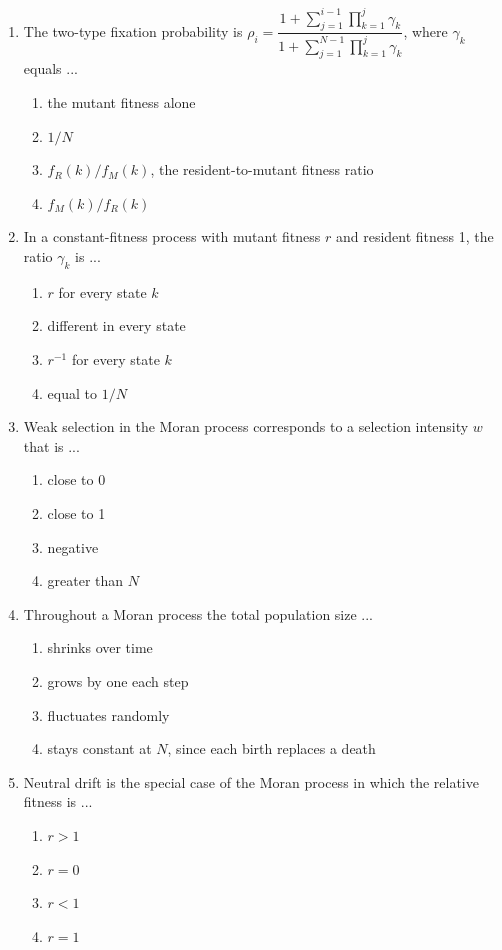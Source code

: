 \documentclass[11pt]{article}
\begin{document}
\begin{enumerate}[itemsep=6pt]
  \begin{enumerate}
    \item exactly \(1\)
    \item above the neutral value \(1/N\)
    \item exactly \(1/2\)
    \item below the neutral value \(1/N\)
  \end{enumerate}
  \item The two-type fixation probability is \(\rho_i = \dfrac{1 + \sum_{j=1}^{i-1}\prod_{k=1}^{j}\gamma_k}{1 + \sum_{j=1}^{N-1}\prod_{k=1}^{j}\gamma_k}\), where \(\gamma_k\) equals ...
  \begin{enumerate}
    \item the mutant fitness alone
    \item \(1/N\)
    \item \(f_R(k)/f_M(k)\), the resident-to-mutant fitness ratio
    \item \(f_M(k)/f_R(k)\)
  \end{enumerate}
  \item In a constant-fitness process with mutant fitness \(r\) and resident fitness 1, the ratio \(\gamma_k\) is ...
  \begin{enumerate}
    \item \(r\) for every state \(k\)
    \item different in every state
    \item \(r^{-1}\) for every state \(k\)
    \item equal to \(1/N\)
  \end{enumerate}
  \item Weak selection in the Moran process corresponds to a selection intensity \(w\) that is ...
  \begin{enumerate}
    \item close to 0
    \item close to 1
    \item negative
    \item greater than \(N\)
  \end{enumerate}
  \item Throughout a Moran process the total population size ...
  \begin{enumerate}
    \item shrinks over time
    \item grows by one each step
    \item fluctuates randomly
    \item stays constant at \(N\), since each birth replaces a death
  \end{enumerate}
  \item Neutral drift is the special case of the Moran process in which the relative fitness is ...
  \begin{enumerate}
    \item \(r > 1\)
    \item \(r = 0\)
    \item \(r < 1\)
    \item \(r = 1\)
  \end{enumerate}
\end{enumerate}
\end{document}

